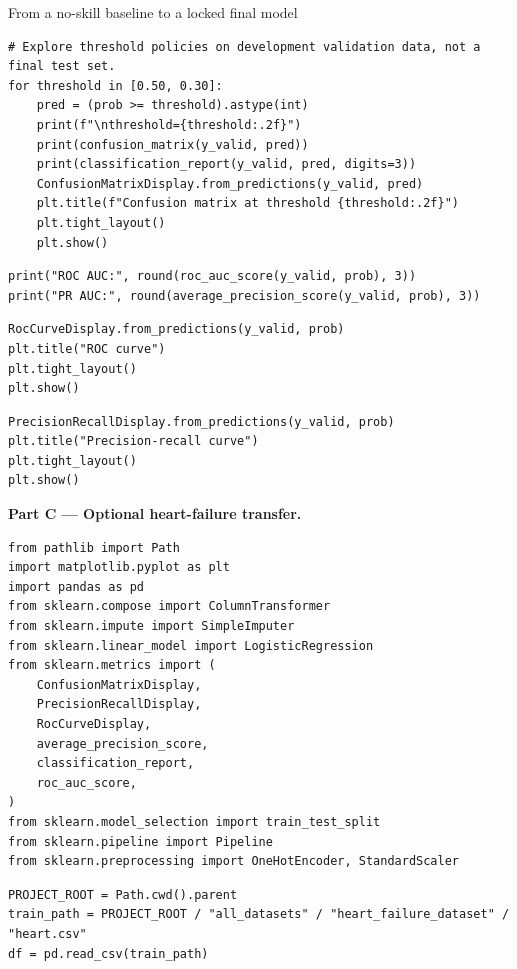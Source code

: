 \begin{labproject}{From a no-skill baseline to a locked final model}
\begin{lstlisting}[style=mlpython]
# Explore threshold policies on development validation data, not a final test set.
for threshold in [0.50, 0.30]:
    pred = (prob >= threshold).astype(int)
    print(f"\nthreshold={threshold:.2f}")
    print(confusion_matrix(y_valid, pred))
    print(classification_report(y_valid, pred, digits=3))
    ConfusionMatrixDisplay.from_predictions(y_valid, pred)
    plt.title(f"Confusion matrix at threshold {threshold:.2f}")
    plt.tight_layout()
    plt.show()
\end{lstlisting}

\begin{lstlisting}[style=mlpython]
print("ROC AUC:", round(roc_auc_score(y_valid, prob), 3))
print("PR AUC:", round(average_precision_score(y_valid, prob), 3))
\end{lstlisting}

\begin{lstlisting}[style=mlpython]
RocCurveDisplay.from_predictions(y_valid, prob)
plt.title("ROC curve")
plt.tight_layout()
plt.show()
\end{lstlisting}

\begin{lstlisting}[style=mlpython]
PrecisionRecallDisplay.from_predictions(y_valid, prob)
plt.title("Precision-recall curve")
plt.tight_layout()
plt.show()
\end{lstlisting}

\medskip\noindent\textbf{Part C --- Optional heart-failure transfer.}\par
\begin{lstlisting}[style=mlpython]
from pathlib import Path
import matplotlib.pyplot as plt
import pandas as pd
from sklearn.compose import ColumnTransformer
from sklearn.impute import SimpleImputer
from sklearn.linear_model import LogisticRegression
from sklearn.metrics import (
    ConfusionMatrixDisplay,
    PrecisionRecallDisplay,
    RocCurveDisplay,
    average_precision_score,
    classification_report,
    roc_auc_score,
)
from sklearn.model_selection import train_test_split
from sklearn.pipeline import Pipeline
from sklearn.preprocessing import OneHotEncoder, StandardScaler
\end{lstlisting}

\begin{lstlisting}[style=mlpython]
PROJECT_ROOT = Path.cwd().parent
train_path = PROJECT_ROOT / "all_datasets" / "heart_failure_dataset" / "heart.csv"
df = pd.read_csv(train_path)
\end{lstlisting}


\end{labproject}
